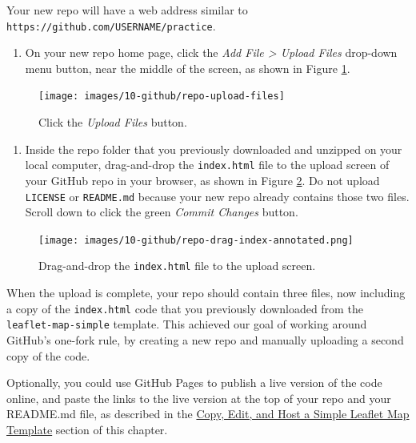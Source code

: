\documentclass[
  english,
]{book}
\providecommand{\tightlist}{%
  \setlength{\itemsep}{0pt}\setlength{\parskip}{0pt}}
\begin{document}
Your new repo will have a web address similar to \texttt{https://github.com/USERNAME/practice}.

\begin{enumerate}
\def\labelenumi{\arabic{enumi}.}
\setcounter{enumi}{4}
\tightlist
\item
  On your new repo home page, click the \emph{Add File \textgreater{} Upload Files} drop-down menu button, near the middle of the screen, as shown in Figure \ref{fig:repo-upload-files}.
\end{enumerate}



\begin{figure}
\texttt{[image: images/10-github/repo-upload-files]} \caption{Click the \emph{Upload Files} button.}\label{fig:repo-upload-files}
\end{figure}

\begin{enumerate}
\def\labelenumi{\arabic{enumi}.}
\setcounter{enumi}{5}
\tightlist
\item
  Inside the repo folder that you previously downloaded and unzipped on your local computer, drag-and-drop the \texttt{index.html} file to the upload screen of your GitHub repo in your browser, as shown in Figure \ref{fig:repo-drag-index}. Do not upload \texttt{LICENSE} or \texttt{README.md} because your new repo already contains those two files. Scroll down to click the green \emph{Commit Changes} button.
\end{enumerate}



\begin{figure}
\centering
\texttt{[image: images/10-github/repo-drag-index-annotated.png]}
\caption{\label{fig:repo-drag-index}Drag-and-drop the \texttt{index.html} file to the upload screen.}
\end{figure}

When the upload is complete, your repo should contain three files, now including a copy of the \texttt{index.html} code that you previously downloaded from the \texttt{leaflet-map-simple} template. This achieved our goal of working around GitHub's one-fork rule, by creating a new repo and manually uploading a second copy of the code.

Optionally, you could use GitHub Pages to publish a live version of the code online, and paste the links to the live version at the top of your repo and your README.md file, as described in the \href{copy-leaflet.html}{Copy, Edit, and Host a Simple Leaflet Map Template} section of this chapter.
\end{document}
